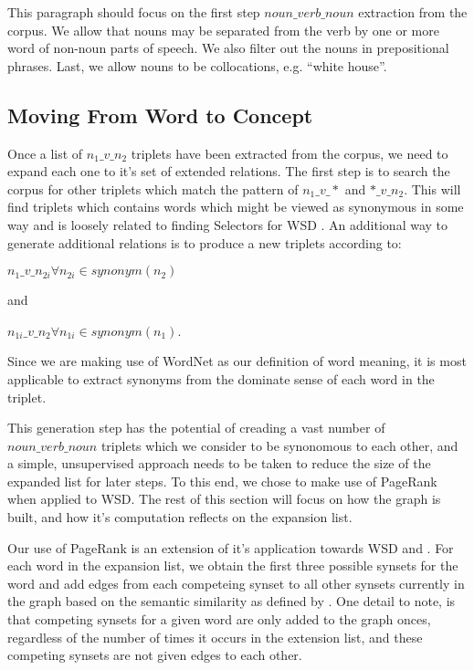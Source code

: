 \documentclass[11pt]{article}
\begin{document}
This paragraph should focus on the first step $noun\_verb\_noun$ extraction from the corpus.
We allow that nouns may be separated from the verb by one or more word of
non-noun parts of speech.  We also filter out the nouns in prepositional
phrases.  Last, we allow nouns to be collocations, e.g. ``white house''.

\subsection{Moving From Word to Concept}

Once a list of $n_1\_v\_n_2$ triplets have been extracted from the corpus, we need to
expand each one to it's set of extended relations.  The first step is to search
the corpus for other triplets which match the pattern of $n_1\_v\_*$ and
$*\_v\_n_2$.  This
will find triplets which contains words which might be viewed as synonymous in
some way and is loosely related to finding Selectors for WSD \cite{schwartz08selectors}.  An
additional way to generate additional relations is to produce a new triplets
according to:

$n_1\_v\_n_{2i} \forall n_{2i} \in synonym(n_2)$

and

$n_{1i}\_v\_n_2 \forall n_{1i} \in synonym(n_1)$. 

Since we are making use of
WordNet as our definition of word meaning, it is most applicable to extract synonyms
from the dominate sense of each word in the triplet.  

This generation step has the potential of creading a vast number of $noun\_verb\_noun$
triplets which we consider to be synonomous to each other, and a simple,
unsupervised approach needs to be taken to reduce the size of the expanded list
for later steps.  To this end, we chose to make use of PageRank when applied to
WSD.  The rest of this section will focus on how the graph is built, and how
it's computation reflects on the expansion list.

Our use of PageRank is an extension of it's application towards WSD
\cite{mihalcea04pagerankwsd} and \cite{mihalcea06randomwalks}.  For each word in
the expansion list, we obtain the first three possible synsets for the word and
add edges from each competeing synset to all other synsets currently in the
graph based on the semantic similarity as defined by
\cite{banerjee03extendedgloss}.  One detail to note, is that competing synsets
for a given word are only added to the graph onces, regardless of the number of
times it occurs in the extension list, and these competing synsets are not
given edges to each other. 
\end{document}
